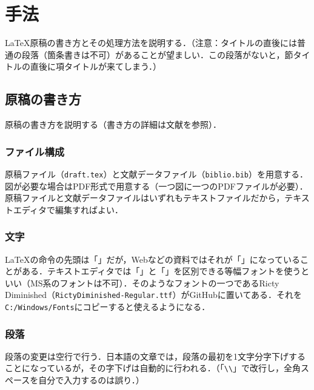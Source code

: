 \documentclass[uplatex,twocolumn,dvipdfmx]{jsarticle}
\begin{document}
\section{手法}

\LaTeX 原稿の書き方とその処理方法を説明する．（注意：タイトルの直後には普通の段落（箇条書きは不可）があることが望ましい．この段落がないと，節タイトルの直後に項タイトルが来てしまう．）

\subsection{原稿の書き方}

原稿の書き方を説明する（書き方の詳細は文献\cite{okumura2013}を参照）．

\subsubsection{ファイル構成}

原稿ファイル（\verb|draft.tex|）と文献データファイル（\verb|biblio.bib|）を用意する．図が必要な場合はPDF形式で用意する（一つ図に一つのPDFファイルが必要）．原稿ファイルと文献データファイルはいずれもテキストファイルだから，テキストエディタで編集すればよい．

\subsubsection{文字}

\LaTeX の命令の先頭は「\hspace{-0.5zw}」だが，Webなどの資料ではそれが「\hspace{-0.5zw}」になっていることがある．テキストエディタでは「\hspace{-0.5zw}」と「\hspace{-0.5zw}」を区別できる等幅フォントを使うといい（MS系のフォントは不可）．そのようなフォントの一つであるRicty Diminished（\verb|RictyDiminished-Regular.ttf|）がGitHubに置いてある．それを\verb|C:/Windows/Fonts|にコピーすると使えるようになる．

\subsubsection{段落}

段落の変更は空行で行う．日本語の文章では，段落の最初を1文字分字下げすることになっているが，その字下げは自動的に行われる．（「\verb|\\|」で改行し，全角スペースを自分で入力するのは誤り．）
\end{document}
